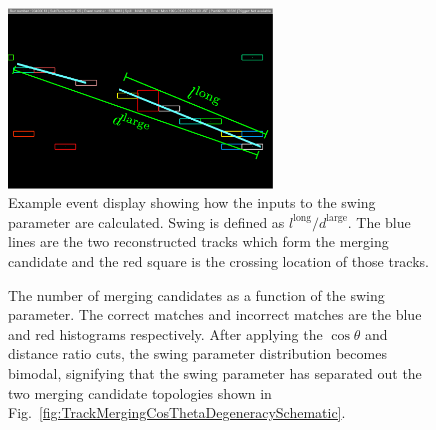 \begin{figure}
  \centering
  \includegraphics[width=7cm]{images/selection/vertex_recon/track_merging_event_display_swing.eps}
  \caption{Example event display showing how the inputs to the swing parameter are calculated.  Swing is defined as $l^{\textrm{long}}/d^{\textrm{large}}$.  The blue lines are the two reconstructed tracks which form the merging candidate and the red square is the crossing location of those tracks.}
  \label{fig:TrackMergingEventDisplaySwing}
\end{figure}
\begin{figure}
  \centering
  \caption{The number of merging candidates as a function of the swing parameter.  The correct matches and incorrect matches are the blue and red histograms respectively.  After applying the $\cos\theta$ and distance ratio cuts, the swing parameter distribution becomes bimodal, signifying that the swing parameter has separated out the two merging candidate topologies shown in Fig.~\ref{fig:TrackMergingCosThetaDegeneracySchematic}.}
  \label{fig:TrackMergingSwing}
\end{figure}
